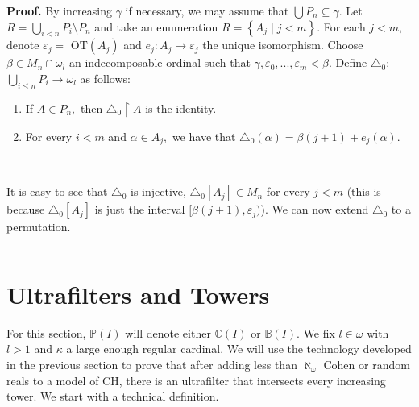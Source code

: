 \documentclass{article}%
\newenvironment{proof}[1][Proof]{\noindent\textbf{#1.} }{\ \rule{0.5em}{0.5em}}
\begin{document}
\begin{proof}
By increasing $\gamma$ if necessary, we may assume that $\bigcup
P_{n}\subseteq\gamma.$ Let $R=\bigcup\limits_{i<n}P_{i}\setminus P_{n}$ and
take an enumeration $R=\left\{  A_{j}\mid j<m\right\}  .$ For each $j<m,$
denote $\varepsilon_{j}=$ \textsf{OT}$\left(  A_{j}\right)  $ and $e_{j}%
:A_{j}\longrightarrow\varepsilon_{j}$ the unique isomorphism. Choose $\beta\in
M_{n}\cap\omega_{l}$ an indecomposable ordinal such that $\gamma
,\varepsilon_{0},...,\varepsilon_{m}<\beta.$ Define $\triangle_{0}:$
$\bigcup\limits_{i\leq n}P_{i}\longrightarrow\omega_{l}$ as follows:

\begin{enumerate}
\item If $A\in P_{n},$ then $\triangle_{0}\upharpoonright A$ is the identity.

\item For every $i<m$ and $\alpha\in A_{j},$ we have that $\triangle
_{0}\left(  \alpha\right)  =\beta\left(  j+1\right)  +e_{j}\left(
\alpha\right)  .$
\end{enumerate}

\qquad\qquad\ \ \ \ \qquad\ \ 

It is easy to see that $\triangle_{0}$ is injective, $\triangle_{0}\left[
A_{j}\right]  \in M_{n}$ for every $j<m$ (this is because $\triangle
_{0}\left[  A_{j}\right]  $ is just the interval $[\beta\left(  j+1\right)
,\varepsilon_{j})$). We can now extend $\triangle_{0}$ to a permutation.
\end{proof}

\section{Ultrafilters and Towers \label{Seccion ultrafiltros y torres}}

For this section, $\mathbb{P}\left(  I\right)  $ will denote either
$\mathbb{C}\left(  I\right)  $ or $\mathbb{B}\left(  I\right)  .$ We fix
$l\in\omega$ with $l>1$ and $\kappa$ a large enough regular cardinal. We will
use the technology developed in the previous section to prove that after
adding less than $\aleph_{\omega}$ Cohen or random reals to a model of
\textsf{CH}, there is an ultrafilter that intersects every increasing tower.
We start with a technical definition.
\end{document}
